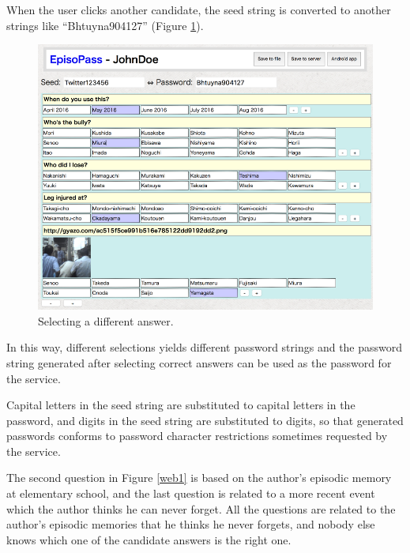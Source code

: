 \documentclass{sigchi}
\begin{document}
When the user clicks another candidate,
the seed string is converted to another strings like
``\textsf{Bhtuyna904127}'' (Figure \ref{web11}).

\begin{figure}[H]
\centering
\includegraphics[width=1.0\columnwidth]{figures/01e5507d090eb494a20bcbc47c86b1d2}
\caption{Selecting a different answer.}
\label{web11}
\end{figure}

In this way, different selections yields different password strings and
the password string generated after selecting correct answers can be
used as the password for the service.

Capital letters in the seed string are substituted to capital letters in the password,
and digits in the seed string are substituted to digits,
so that generated passwords conforms to password character restrictions
sometimes requested by the service.


The second question in Figure \ref{web1}
is based on the author's episodic memory at elementary school,
and the last question is related to a more recent event
which the author thinks he can never forget.
All the questions are related to the author's episodic memories
that he thinks he never forgets, and nobody else knows which one of the
candidate answers is the right one.
\end{document}
